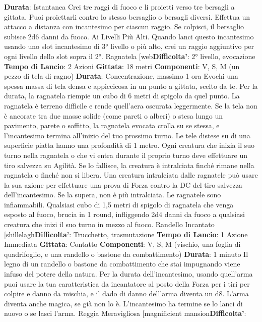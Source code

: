 \begin{multicols}{2}
\textbf{Durata}: Istantanea
Crei tre raggi di fuoco e li proietti verso tre bersagli a
gittata. Puoi proiettarli contro lo stesso bersaglio o
bersagli diversi.
Effettua un attacco a distanza con incantesimo per
ciascun raggio. Se colpisci, il bersaglio subisce 2d6
danni da fuoco.
Ai Livelli Più Alti. Quando lanci questo incantesimo
usando uno slot incantesimo di 3° livello o più alto, crei
un raggio aggiuntivo per ogni livello dello slot sopra il
2°.
Ragnatela
[web\textbf{Difficolta'}:
2° livello, evocazione
\textbf{Tempo di Lancio}: 2 Azioni
\textbf{Gittata}: 18 metri
\textbf{Componenti}: V, S, M (un pezzo di tela di ragno)
\textbf{Durata}: Concentrazione, massimo 1 ora
Evochi una spessa massa di tela densa e appiccicosa
in un punto a gittata, scelto da te. Per la durata, la
ragnatela riempie un cubo di 6 metri di spigolo da quel
punto. La ragnatela è terreno difficile e rende quell’aera
oscurata leggermente.
Se la tela non è ancorate tra due masse solide (come
pareti o alberi) o stesa lungo un pavimento, parete o
soffitto, la ragnatela evocata crolla su se stessa, e
l’incantesimo termina all’inizio del tuo prossimo turno.
Le tele distese su di una superficie piatta hanno una
profondità di 1 metro.
Ogni creatura che inizia il suo turno nella ragnatela o
che vi entra durante il proprio turno deve effettuare un
tiro salvezza su Agilità. Se lo fallisce, la creatura è
intralciata finché rimane nella ragnatela o finché non si
libera.
Una creatura intralciata dalle ragnatele può usare la
sua azione per effettuare una prova di Forza contro la
DC del tiro salvezza dell’incantesimo. Se la supera, non
è più intralciata.
Le ragnatele sono infiammabili. Qualsiasi cubo di 1,5
metri di spigolo di ragnatela che venga esposto al
fuoco, brucia in 1 round, infliggendo 2d4 danni da fuoco
a qualsiasi creatura che inizi il suo turno in mezzo al
fuoco.
Randello Incantato
[shillelagh\textbf{Difficolta'}:
Trucchetto, trasmutazione
\textbf{Tempo di Lancio}: 1 Azione Immediata
\textbf{Gittata}: Contatto
\textbf{Componenti}: V, S, M (vischio, una foglia di
quadrifoglio, e una randello o bastone da
combattimento)
\textbf{Durata}: 1 minuto
Il legno di un randello o bastone da combattimento che
stai impugnando viene infuso del potere della natura.
Per la durata dell’incantesimo, usando quell’arma puoi
usare la tua caratteristica da incantatore al posto della
Forza per i tiri per colpire e danno da mischia, e il dado
di danno dell’arma diventa un d8. L’arma diventa anche
magica, se già non lo è. L’incantesimo ha termine se lo
lanci di nuovo o se lasci l’arma.
Reggia Meravigliosa
[magnificient mansion\textbf{Difficolta'}:

\end{multicols}
